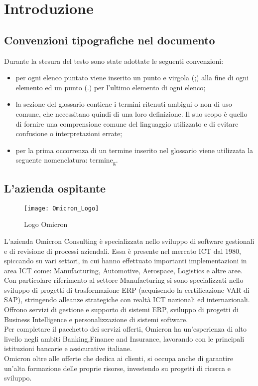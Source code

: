 \chapter{Introduzione}
\label{cap:introduzione}
\section{Convenzioni tipografiche nel documento}
Durante la stesura del testo sono state adottate le seguenti convenzioni:
\begin{itemize}
\item per ogni elenco puntato viene inserito un punto e virgola (;) alla fine di ogni elemento ed un punto (.) per l'ultimo elemento di ogni elenco;
\item la sezione del glossario contiene i termini ritenuti ambigui o non di uso comune, che necessitano quindi di una loro definizione. Il suo scopo è quello di fornire una comprensione comune del linguaggio utilizzato e di evitare confusione o interpretazioni errate;
\item per la prima occorrenza di un termine inserito nel glossario viene utilizzata la seguente nomenclatura: termine\textsubscript{g}.\\
\end{itemize}

\section{L'azienda ospitante}

\begin{figure}[!h] 
    \centering 
    \texttt{[image: Omicron\_Logo]} 
    \caption{Logo Omicron}
\end{figure}

\noindent L’azienda Omicron Consulting è specializzata nello sviluppo di software gestionali e di revisione di processi aziendali. Essa è presente nel mercato ICT dal 1980, spiccando su vari settori, in cui hanno effettuato importanti implementazioni in area ICT come: Manufacturing, Automotive, Aerospace, Logistics e altre aree.
Con particolare riferimento al settore Manufacturing si sono specializzati nello sviluppo di progetti di trasformazione ERP (acquisendo la certificazione VAR di SAP), stringendo alleanze strategiche con realtà ICT nazionali ed internazionali.\\
Offrono servizi di gestione e supporto di sistemi ERP, sviluppo di progetti di Business Intelligence e personalizzazione di sistemi software.\\
Per completare il pacchetto dei servizi offerti, Omicron ha un'esperienza di alto livello negli ambiti Banking,Finance and Insurance, lavorando con le principali istituzioni bancarie e assicurative italiane.\\
Omicron oltre alle offerte che dedica ai clienti, si occupa anche di garantire un'alta formazione delle proprie risorse, investendo su progetti di ricerca e sviluppo.

